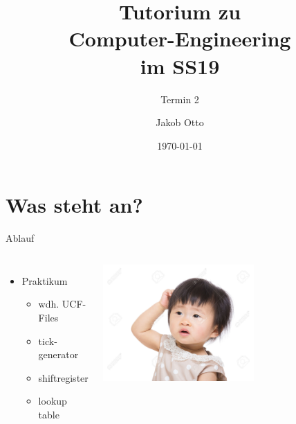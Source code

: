 \documentclass[aspectratio=169,presentation]{beamer}
\date{\today}
\newcommand{\terminNummer}{2}
\begin{document}
	\title[CE Tutorium]{Tutorium zu\\Computer-Engineering\\im SS19}
	\subtitle{Termin \terminNummer}
	\author[Otto]{Jakob Otto}
	\subject{CE Tutorium}
	
	\begin{frame}
		\titlepage
	\end{frame}

\section{Was steht an?}
\begin{frame}{Ablauf}
	\begin{columns}
		\column{0.6\textwidth}
		\begin{itemize}
			\item Praktikum
			\begin{itemize}
				\item wdh. UCF-Files
				\item tick-generator
				\item shiftregister
				\item lookup table
			\end{itemize}
		\end{itemize}
		\column{0.4\textwidth}
		\includegraphics[width=0.6\textwidth]{kratzen}
	\end{columns}
\end{frame}

%
%
%
\end{document}
